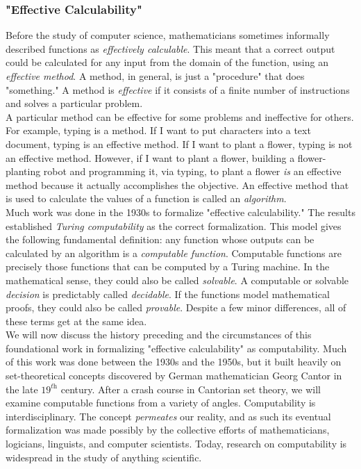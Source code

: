 \subsubsection{"Effective Calculability"}

Before the study of computer science, mathematicians sometimes informally described functions as \textit{effectively calculable}. This meant that a correct output could be calculated for any input from the domain of the function, using an \textit{effective method}. A method, in general, is just a "procedure" that does "something." A method is \textit{effective} if it consists of a finite number of instructions and solves a particular problem. \\

A particular method can be effective for some problems and ineffective for others. For example, typing is a method. If I want to put characters into a text document, typing is an effective method. If I want to plant a flower, typing is not an effective method. However, if I want to plant a flower, building a flower-planting robot and programming it, via typing, to plant a flower \textit{is} an effective method because it actually accomplishes the objective. An effective method that is used to calculate the values of a function is called an \textit{algorithm}. \\

Much work was done in the 1930s to formalize "effective calculability." The results established \textit{Turing computability} as the correct formalization. This model gives the following fundamental definition: any function whose outputs can be calculated by an algorithm is a \textit{computable function}. Computable functions are precisely those functions that can be computed by a Turing machine. In the mathematical sense, they could also be called \textit{solvable}. A computable or solvable \textit{decision} is predictably called \textit{decidable}. If the functions model mathematical proofs, they could also be called \textit{provable}. Despite a few minor differences, all of these terms get at the same idea. \\

We will now discuss the history preceding and the circumstances of this foundational work in formalizing "effective calculability" as computability. Much of this work was done between the 1930s and the 1950s, but it built heavily on set-theoretical concepts discovered by German mathematician Georg Cantor in the late $19^\textit{th}$ century. After a crash course in Cantorian set theory, we will examine computable functions from a variety of angles. Computability is interdisciplinary. The concept \textit{permeates} our reality, and as such its eventual formalization was made possibly by the collective efforts of mathematicians, logicians, linguists, and computer scientists. Today, research on computability is widespread in the study of anything scientific. \\

